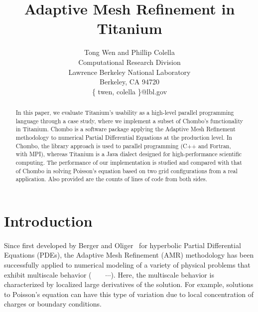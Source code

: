 \documentclass{ieee}
\numberwithin{equation}{section}
\begin{document}
\title{Adaptive Mesh Refinement in Titanium}

\author{Tong Wen and Phillip Colella\\
Computational Research Division\\  Lawrence Berkeley National Laboratory\\ Berkeley, CA 94720\\ \{ twen, colella \}@lbl.gov\\
}

\maketitle
\thispagestyle{empty}

\begin{abstract}
In this paper, we evaluate Titanium's usability as a high-level parallel programming language through a case study, where we implement a subset of Chombo's functionality in Titanium. Chombo is a software package applying the Adaptive Mesh Refinement methodology to  numerical Partial Differential Equations at the production level. In Chombo, the library approach is used to parallel programming (C++ and Fortran, with MPI), whereas Titanium is a Java dialect designed for high-performance scientific computing. The performance of our implementation is studied and compared with that of Chombo in solving Poisson's equation based on two grid configurations from a real application. Also provided are the counts of lines of code from both sides.
\end{abstract}



\section{Introduction}
\paragraph{}Since first developed by Berger and Oliger~\cite{Berger:1984} for hyperbolic Partial Differential Equations (PDEs), the Adaptive Mesh Refinement (AMR) methodology has been successfully applied to numerical modeling of a variety of physical problems that exhibit multiscale behavior (~\cite{Berger:1989}~\cite{Bell:1994}~\cite{Almgren:1998}~$\cdots$). Here, the multiscale behavior is characterized by localized large derivatives of the solution.  For example, solutions to Poisson's equation can have this type of variation due to local concentration of charges or boundary conditions.
\end{document}
